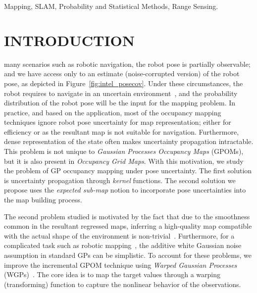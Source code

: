 \documentclass[letterpaper, 10 pt, journal, twoside]{IEEEtran}  %
\begin{document}
\begin{IEEEkeywords}
Mapping, SLAM, Probability and Statistical Methods, Range Sensing.
\end{IEEEkeywords}

\IEEEpeerreviewmaketitle

\section{INTRODUCTION}

 many scenarios such as robotic navigation, the robot pose is partially observable; and we have access only to an estimate (noise-corrupted version) of the robot pose, as depicted in Figure~\ref{fig:intel_posecov}. Under these circumstances, the robot requires to navigate in an uncertain environment~\cite{roy1999coastal,Prentice01112009,valencia2013planning,vallve2015potential}, and the probability distribution of the robot pose will be the input for the mapping problem. In practice, and based on the application, most of the occupancy mapping techniques ignore robot pose uncertainty for map representation; either for efficiency or as the resultant map is not suitable for navigation. Furthermore, dense representation of the state often makes uncertainty propagation intractable. This problem is not unique to \emph{Gaussian Processes Occupancy Maps} (GPOMs), but it is also present in \emph{Occupancy Grid Maps}. With this motivation, we study the problem of GP occupancy mapping under pose uncertainty. The first solution is uncertainty propagation through \textit{kernel} functions. The second solution we propose uses the \textit{expected sub-map} notion to incorporate pose uncertainties into the map building process.

The second problem studied is motivated by the fact that due to the smoothness common in the resultant regressed maps, inferring a high-quality map compatible with the actual shape of the environment is non-trivial~\cite{jadidi2016gaussian}. 
Furthermore, for a complicated task such as robotic mapping~\cite{Thrun:2003:RMS:779343.779345}, the additive white Gaussian noise assumption in standard GPs can be simplistic. To account for these problems, we improve the incremental GPOM technique using \emph{Warped Gaussian Processes} (WGPs)~\cite{snelson2004warped}. The core idea is to map the target values through a warping (transforming) function to capture the nonlinear behavior of the observations.
\end{document}
